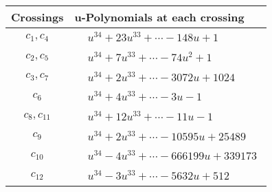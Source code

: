 \documentclass[1p]{elsarticle_modified}
\theoremstyle{definition}
\begin{document}
\begin{tabular}{m{50pt}|m{274pt}}
Crossings & \hspace{64pt}u-Polynomials at each crossing \\
\hline $$\begin{aligned}c_{1},c_{4}\end{aligned}$$&$\begin{aligned}
&u^{34}+23 u^{33}+\cdots-148 u+1
\end{aligned}$\\
\hline $$\begin{aligned}c_{2},c_{5}\end{aligned}$$&$\begin{aligned}
&u^{34}+7 u^{33}+\cdots-74 u^2+1
\end{aligned}$\\
\hline $$\begin{aligned}c_{3},c_{7}\end{aligned}$$&$\begin{aligned}
&u^{34}+2 u^{33}+\cdots-3072 u+1024
\end{aligned}$\\
\hline $$\begin{aligned}c_{6}\end{aligned}$$&$\begin{aligned}
&u^{34}+4 u^{33}+\cdots-3 u-1
\end{aligned}$\\
\hline $$\begin{aligned}c_{8},c_{11}\end{aligned}$$&$\begin{aligned}
&u^{34}+12 u^{33}+\cdots-11 u-1
\end{aligned}$\\
\hline $$\begin{aligned}c_{9}\end{aligned}$$&$\begin{aligned}
&u^{34}+2 u^{33}+\cdots-10595 u+25489
\end{aligned}$\\
\hline $$\begin{aligned}c_{10}\end{aligned}$$&$\begin{aligned}
&u^{34}-4 u^{33}+\cdots-666199 u+339173
\end{aligned}$\\
\hline $$\begin{aligned}c_{12}\end{aligned}$$&$\begin{aligned}
&u^{34}-3 u^{33}+\cdots-5632 u+512
\end{aligned}$\\
\hline
\end{tabular}\\~\\
\end{document}
